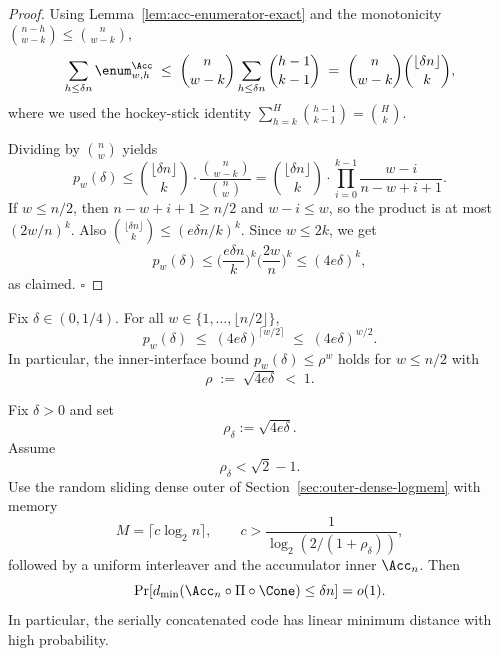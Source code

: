 \begin{proof}
Using Lemma~\ref{lem:acc-enumerator-exact} and the monotonicity \(\binom{n-h}{w-k}\le \binom{n}{w-k}\),
\[
\sum_{h\le \delta n}\enum^{\Acc}_{w,h}
\;\le\;
\binom{n}{w-k}\sum_{h\le \delta n}\binom{h-1}{k-1}
\;=\;
\binom{n}{w-k}\binom{\lfloor \delta n\rfloor}{k},
\]
where we used the hockey-stick identity \(\sum_{h=k}^{H}\binom{h-1}{k-1}=\binom{H}{k}\).

Dividing by \(\binom{n}{w}\) yields
\[
p_w(\delta)\le \binom{\lfloor \delta n\rfloor}{k}\cdot \frac{\binom{n}{w-k}}{\binom{n}{w}}
=
\binom{\lfloor \delta n\rfloor}{k}\cdot \prod_{i=0}^{k-1}\frac{w-i}{n-w+i+1}.
\]
If \(w\le n/2\), then \(n-w+i+1\ge n/2\) and \(w-i\le w\), so the product is at most \((2w/n)^k\).
Also \(\binom{\lfloor \delta n\rfloor}{k}\le (e\delta n/k)^k\).
Since \(w\le 2k\), we get
\[
p_w(\delta)\le \Big(\frac{e\delta n}{k}\Big)^k \Big(\frac{2w}{n}\Big)^k
\le (4e\delta)^k,
\]
as claimed. \(\square\)
\end{proof}

\begin{corollary}
\label{cor:acc-inner-interface}
Fix \(\delta\in(0,1/4)\). For all \(w\in\{1,\dots,\lfloor n/2\rfloor\}\),
\[
p_w(\delta)\;\le\; (4e\delta)^{\lceil w/2\rceil}
\;\le\;
(4e\delta)^{w/2}.
\]
In particular, the inner-interface bound \(p_w(\delta)\le \rho^w\) holds for \(w\le n/2\) with
\[
\rho \;:=\; \sqrt{4e\delta}\;<\;1.
\]
\end{corollary}

\begin{theorem}
\label{thm:accumulator-warmup-linear-distance}
Fix \(\delta>0\) and set
\[
\rho_\delta:=\sqrt{4e\delta}.
\]
Assume
\[
\rho_\delta<\sqrt2-1.
\]
Use the random sliding dense outer of Section~\ref{sec:outer-dense-logmem} with memory
\[
M=\lceil c\log_2 n\rceil,
\qquad
c>\frac{1}{\log_2(2/(1+\rho_\delta))},
\]
followed by a uniform interleaver and the accumulator inner \(\Acc_n\).  Then
\[
\Pr[d_{\min}(\Acc_n\circ\Pi\circ\Cone)\le \delta n]=o(1).
\]
In particular, the serially concatenated code has linear minimum distance with high probability.
\end{theorem}


